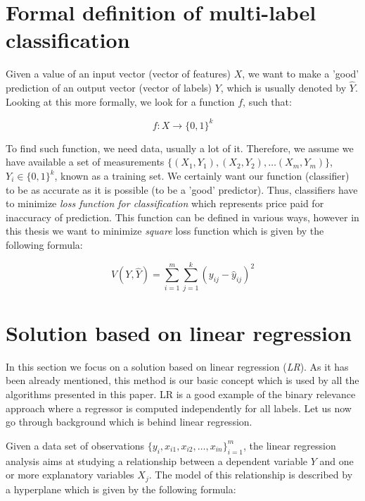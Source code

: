 \section{Formal definition of multi-label classification}

Given a value of an input vector (vector of features) $X$, we want to make a 'good' prediction of an output vector (vector of labels) $Y$, which is usually denoted by $\hat{Y}$. Looking at this more formally, we look for a function $f$, such that:   

\begin{equation}\label{eq:def}
    f: X \rightarrow \{0,1\}^k 
\end{equation}

To find such function, we need data, usually a lot of it. Therefore, we assume we have available a set of measurements $\{(X_1, Y_1), (X_2, Y_2), \dots (X_m, Y_m)\}$, $Y_i\in\{0,1\}^k$, known as a training set. We certainly want our function (classifier) to be as accurate as it is possible (to be a 'good' predictor). Thus, classifiers have to minimize \textit{loss function for classification} which represents price paid for inaccuracy of prediction. This function can be defined in various ways, however in this thesis we want to minimize \textit{square} loss function which is given by the following formula:

\begin{equation}\label{eq:def}
    V(Y,\hat{Y})= \sum\limits_{i=1}^{m}\sum\limits_{j=1}^{k}(y_{ij}-\hat{y}_{ij})^2
\end{equation}


\section{Solution based on linear regression}

In this section we focus on a solution based on linear regression (\textit{LR}). As it has been already mentioned, this method is our basic concept which is used by all the algorithms presented in this paper. LR is a good example of the binary relevance approach where a regressor is computed independently for all labels. Let us now go through background which is behind linear regression. 

Given a data set of observations $\{y_i, x_{i1}, x_{i2}, \dots, x_{in}\}_{i=1}^{m}$, the linear regression analysis aims at studying a relationship between a dependent variable $Y$ and one or more explanatory variables $X_{j}$. The model of this relationship is described by a hyperplane which is given by the following formula:


